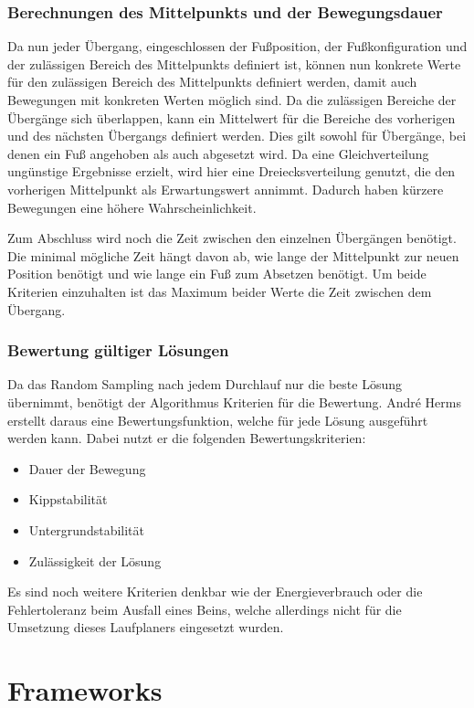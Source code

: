 \subsubsection{Berechnungen des Mittelpunkts und der Bewegungsdauer}

Da nun jeder Übergang, eingeschlossen der Fußposition, der Fußkonfiguration und der zulässigen Bereich des Mittelpunkts definiert ist, können nun konkrete Werte für den zulässigen Bereich des Mittelpunkts definiert werden, damit auch Bewegungen mit konkreten Werten möglich sind. Da die zulässigen Bereiche der Übergänge sich überlappen, kann ein Mittelwert für die Bereiche des vorherigen und des nächsten Übergangs definiert werden. Dies gilt sowohl für Übergänge, bei denen ein Fuß angehoben als auch abgesetzt wird. Da eine Gleichverteilung ungünstige Ergebnisse erzielt, wird hier eine Dreiecksverteilung genutzt, die den vorherigen Mittelpunkt als Erwartungswert annimmt. Dadurch haben kürzere Bewegungen eine höhere Wahrscheinlichkeit.  

Zum Abschluss wird noch die Zeit zwischen den einzelnen Übergängen benötigt. Die minimal mögliche Zeit hängt davon ab, wie lange der Mittelpunkt zur neuen Position benötigt und wie lange ein Fuß zum Absetzen benötigt. Um beide Kriterien einzuhalten ist das Maximum beider Werte die Zeit zwischen dem Übergang.

\subsubsection{Bewertung gültiger Lösungen}

Da das Random Sampling nach jedem Durchlauf nur die beste Lösung übernimmt, benötigt der Algorithmus Kriterien für die Bewertung. André Herms erstellt daraus eine Bewertungsfunktion, welche für jede Lösung ausgeführt werden kann. Dabei nutzt er die folgenden Bewertungskriterien:
\begin{itemize}
  \item Dauer der Bewegung
  \item Kippstabilität
  \item Untergrundstabilität
  \item Zulässigkeit der Lösung
\end{itemize}

Es sind noch weitere Kriterien denkbar wie der Energieverbrauch oder die Fehlertoleranz beim Ausfall eines Beins, welche allerdings nicht für die Umsetzung dieses Laufplaners eingesetzt wurden.

\section{Frameworks}

